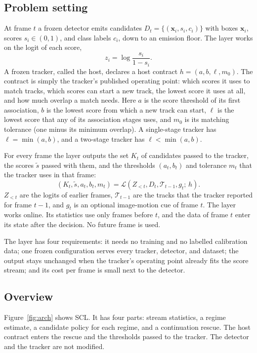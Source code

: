 \documentclass[pdflatex,sn-mathphys-num,iicol]{sn-jnl}
\newcommand{\scl}{SCL}
\begin{document}
\subsection{Problem setting}\label{sec:problem}
At frame $t$ a frozen detector emits candidates $D_t=\{(\mathbf{x}_i,s_i,c_i)\}$
with boxes $\mathbf{x}_i$, scores $s_i\in(0,1)$, and class labels $c_i$, down
to an emission floor. The layer works on the logit of each score,
\begin{equation}
z_i=\log\frac{s_i}{1-s_i}.
\label{eq:logit}
\end{equation}
A frozen tracker, called the host, declares a host contract
$h=(a,b,\ell,m_0)$. The contract is simply the tracker's published operating
point: which scores it uses to match tracks, which scores can start a new
track, the lowest score it uses at all, and how much overlap a match needs.
Here $a$ is the score threshold of its first association,
$b$ is the lowest score from which a new track can start, $\ell$ is the lowest
score that any of its association stages uses, and $m_0$ is its matching
tolerance (one minus its minimum overlap). A single-stage tracker has
$\ell=\min(a,b)$, and a two-stage tracker has $\ell<\min(a,b)$.

For every frame the layer outputs the set $K_t$ of candidates passed to the
tracker, the scores $\tilde{s}$ passed with them, and the thresholds
$(a_t,b_t)$ and tolerance $m_t$ that the tracker uses in that frame:
\begin{equation}
\left(K_t,\tilde{s},a_t,b_t,m_t\right)=
\mathcal{L}\left(Z_{<t},D_t,\mathcal{T}_{t-1},g_t;\,h\right).
\label{eq:layer}
\end{equation}
$Z_{<t}$ are the logits of earlier frames, $\mathcal{T}_{t-1}$ are the
tracks that the tracker reported for frame $t-1$, and $g_t$ is an optional
image-motion cue of frame $t$. The layer works online. Its statistics use only
frames before $t$, and the data of frame $t$ enter its state after the
decision. No future frame is used.

The layer has four requirements: it needs no training and no labelled
calibration data; one frozen configuration serves every tracker, detector, and
dataset; the output stays unchanged when the tracker's operating point already
fits the score stream; and its cost per frame is small next to the detector.

\subsection{Overview}
Figure~\ref{fig:arch} shows \scl{}. It has four parts: stream statistics, a
regime estimate, a candidate policy for each regime, and a continuation
rescue. The host contract enters the rescue and the thresholds passed to the
tracker. The detector and the tracker are not modified.
\end{document}
